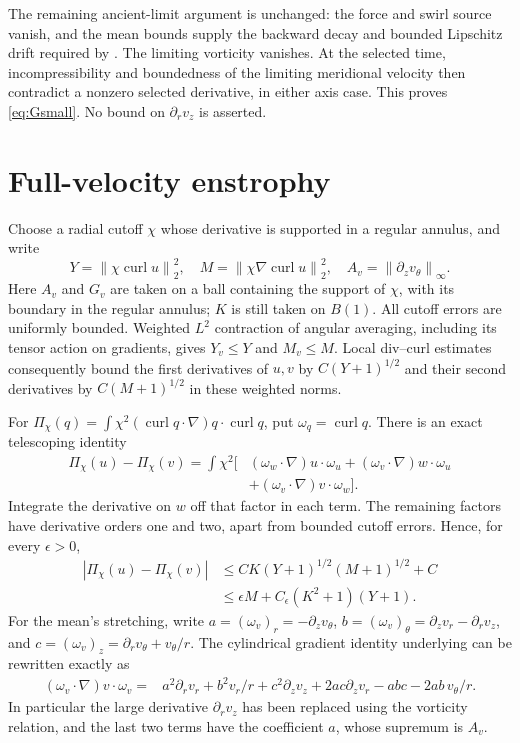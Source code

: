\documentclass[11pt]{article}
\theoremstyle{remark}
\newcommand{\norm}[1]{\left\lVert#1\right\rVert}
\newcommand{\curl}{\operatorname{curl}}
\begin{document}
The remaining ancient-limit argument is unchanged: the force and swirl
source vanish, and the mean bounds supply the backward decay and
bounded Lipschitz drift required by \cite[Lemma~3.3]{CIV}. The limiting
vorticity vanishes. At the selected time, incompressibility and
boundedness of the limiting meridional velocity then contradict a
nonzero selected derivative, in either axis case. This proves
\eqref{eq:Gsmall}. No bound on $\partial_r v_z$ is asserted.

\section{Full-velocity enstrophy}

Choose a radial cutoff $\chi$ whose derivative is supported in a regular
annulus, and write
\[
 Y=\norm{\chi\curl u}_2^2,\quad
 M=\norm{\chi\nabla\curl u}_2^2,\quad
 A_v=\norm{\partial_z v_\theta}_\infty.
\]
Here $A_v$ and $G_v$ are taken on a ball containing the support of $\chi$,
with its boundary in the regular annulus; $K$ is still taken on $B(1)$.
All cutoff errors are uniformly bounded. Weighted $L^2$ contraction
of angular averaging, including its tensor action on gradients, gives
$Y_v\leq Y$ and $M_v\leq M$. Local div--curl estimates consequently
bound the first derivatives of $u,v$ by $C(Y+1)^{1/2}$ and their second
derivatives by $C(M+1)^{1/2}$ in these weighted norms.

For $\Pi_\chi(q)=\int\chi^2(\curl q\cdot\nabla)q\cdot\curl q$, put
$\omega_q=\curl q$. There is an exact telescoping identity
\begin{equation}\label{eq:telescope}
\begin{split}
 \Pi_\chi(u)-\Pi_\chi(v)=\int\chi^2\big[&
 (\omega_w\cdot\nabla)u\cdot\omega_u
 +(\omega_v\cdot\nabla)w\cdot\omega_u\\
 &+(\omega_v\cdot\nabla)v\cdot\omega_w\big].
\end{split}
\end{equation}
Integrate the derivative on $w$ off that factor in each term. The
remaining factors have derivative orders one and two, apart from
bounded cutoff errors. Hence, for every $\epsilon>0$,
\begin{align*}
 |\Pi_\chi(u)-\Pi_\chi(v)|
 &\leq CK(Y+1)^{1/2}(M+1)^{1/2}+C\\
 &\leq\epsilon M+C_\epsilon(K^2+1)(Y+1).
\end{align*}
For the mean's stretching, write
$a=(\omega_v)_r=-\partial_z v_\theta$,
$b=(\omega_v)_\theta=\partial_z v_r-\partial_r v_z$, and
$c=(\omega_v)_z=\partial_r v_\theta+v_\theta/r$.
The cylindrical gradient identity underlying \cite[Equation~(5.7)]{CIV}
can be rewritten exactly as
\begin{equation}\label{eq:cylindricalStretch}
\begin{split}
 (\omega_v\cdot\nabla)v\cdot\omega_v
 ={}&a^2\partial_r v_r+b^2v_r/r+c^2\partial_z v_z
                    +2ac\partial_z v_r-abc-2ab\,v_\theta/r.
\end{split}
\end{equation}
In particular the large derivative $\partial_r v_z$ has been replaced
using the vorticity relation, and the last two terms have the coefficient
$a$, whose supremum is $A_v$.
\end{document}
